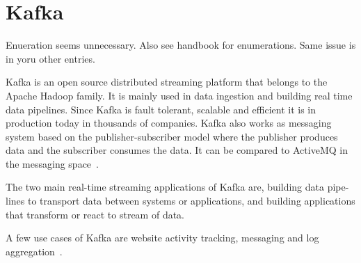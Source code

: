 \section{Kafka}

\begin{NOTE}
Enueration seems unnecessary. Also see handbook for enumerations. Same
issue is in yoru other entries.
\end{NOTE}

Kafka is an open source distributed streaming platform that belongs 
to the Apache Hadoop family. It is mainly used in data ingestion and 
building real time data pipelines. Since Kafka is fault tolerant, 
scalable and efficient it is in production today in thousands of 
companies. Kafka also works as messaging system based on the 
publisher-subscriber model where the publisher produces data and 
the subscriber consumes the data. It can be compared to ActiveMQ 
in the messaging space~\cite{hid-sp18-517-ApacheKafka}.

The two main real-time streaming applications of Kafka are, building 
data pipe-lines to transport data between systems or applications,
and building applications that transform or react to stream of data.

A few use cases of Kafka are website activity tracking, messaging 
and log aggregation~\cite{hid-sp18-517-ApacheKafka}.
